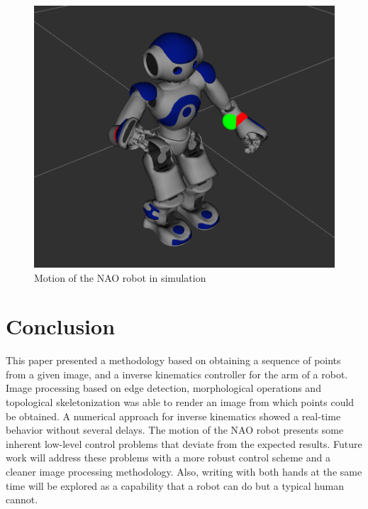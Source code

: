 \documentclass[conference]{IEEEtran}
\begin{document}
\begin{figure}
\centering
\includegraphics[scale=0.3]{nao1.png}
\caption{Motion of the NAO robot in simulation}
\label{f:nao-sim}
\end{figure}

\section{Conclusion}
\label{sec:conclusion}
This paper presented a methodology based on obtaining a sequence of points from a given image, and a inverse kinematics controller for the arm of a robot. Image processing based on edge detection, morphological operations and topological skeletonization was able to render an image from which points could be obtained. A numerical approach for inverse kinematics showed a real-time behavior without several delays. The motion of the NAO robot presents some inherent low-level control problems that deviate from the expected results. Future work will address these problems with a more robust control scheme and a cleaner image processing methodology. Also, writing with both hands at the same time will be explored as a capability that a robot can do but a typical human cannot.



\end{document}
